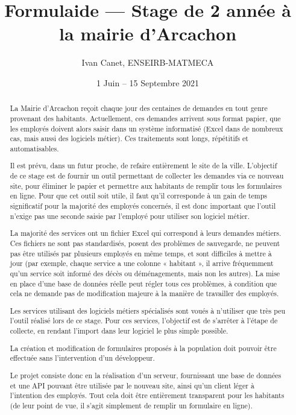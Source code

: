 \documentclass[11pt,french]{memoir}
\begin{document}
	\renewcommand{\chaptername}{Partie}

	\frontmatter
	\title{Formulaide --- Stage de 2\ieme{} année à la mairie d'Arcachon}
	\date{1\ier{} Juin -- 15 Septembre 2021}
	\author{Ivan Canet, ENSEIRB-MATMECA}
	\maketitle

	\begin{abstract}
		La Mairie d’Arcachon reçoit chaque jour des centaines de demandes en tout genre provenant des habitants.
		Actuellement, ces demandes arrivent sous format papier, que les employés doivent alors saisir dans un système informatisé (Excel dans de nombreux cas, mais aussi des logiciels métier).
		Ces traitements sont longs, répétitifs et automatisables.

		Il est prévu, dans un futur proche, de refaire entièrement le site de la ville.
		L’objectif de ce stage est de fournir un outil permettant de collecter les demandes via ce nouveau site, pour éliminer le papier et permettre aux habitants de remplir tous les formulaires en ligne.
		Pour que cet outil soit utile, il faut qu’il corresponde à un gain de temps significatif pour la majorité des employés concernés, il est donc important que l’outil n’exige pas une seconde saisie par l’employé pour utiliser son logiciel métier.

		La majorité des services ont un fichier Excel qui correspond à leurs demandes métiers.
		Ces fichiers ne sont pas standardisés, posent des problèmes de sauvegarde, ne peuvent pas être utilisés par plusieurs employés en même temps, et sont difficiles à mettre à jour (par exemple, chaque service a une colonne « habitant », il arrive fréquemment qu’un service soit informé des décès ou déménagements, mais non les autres).
		La mise en place d’une base de données réelle peut régler tous ces problèmes, à condition que cela ne demande pas de modification majeure à la manière de travailler des employés.

		Les services utilisant des logiciels métiers spécialisés sont voués à n’utiliser que très peu l’outil réalisé lors de ce stage.
		Pour ces services, l’objectif est de s’arrêter à l’étape de collecte, en rendant l’import dans leur logiciel le plus simple possible.

		La création et modification de formulaires proposés à la population doit pouvoir être effectuée sans l’intervention d’un développeur.

		\uparagraph
		Le projet consiste donc en la réalisation d’un serveur, fournissant une base de données
		et une API pouvant être utilisée par le nouveau site, ainsi qu’un client léger à l’intention des
		employés.
		Tout cela doit être entièrement transparent pour les habitants (de leur point de vue,
		il s’agit simplement de remplir un formulaire en ligne).
	\end{abstract}
\end{document}

